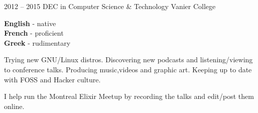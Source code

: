 \documentclass[9pt]{developercv} %
\begin{document}


\begin{entrylist}
	\entry
		{2012 -- 2015}
		{DEC in Computer Science \& Technology}
		{Vanier College}
		{}
\end{entrylist}


\begin{minipage}[t]{0.3\textwidth}
	\vspace{-\baselineskip} %

	
	\textbf{English} - native\\
	\textbf{French} - proficient\\
	\textbf{Greek} - rudimentary
\end{minipage}
\hfill
\begin{minipage}[t]{0.3\textwidth}
	\vspace{-\baselineskip} %
	
	
  Trying new GNU/Linux distros.
  Discovering new podcasts and listening/viewing to conference talks.
  Producing music,videos and graphic art.
  Keeping up to date with FOSS and Hacker culture.
\end{minipage}
\hfill
\begin{minipage}[t]{0.3\textwidth}
	\vspace{-\baselineskip} %
	
	
	I help run the Montreal Elixir Meetup by recording the talks and edit/post them online.
\end{minipage}

\end{document}
